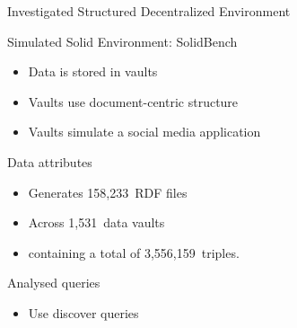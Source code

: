 \begin{frame}{Investigated Structured Decentralized Environment}
  \begin{block}{Simulated Solid Environment: SolidBench \parencite{taelman2023link}}
    \begin{itemize}
        \item Data is stored in vaults
        \item Vaults use document-centric structure
        \item Vaults simulate a social media application
    \end{itemize}
  \end{block}
  \begin{block}{Data attributes}
        \begin{itemize}
            \item Generates 158,233~RDF files 
            \item Across 1,531~data vaults
            \item containing a total of 3,556,159~triples.
    \end{itemize}
  \end{block}
  \begin{block}{Analysed queries}
        \begin{itemize}
        \item Use discover queries
    \end{itemize}
  \end{block}
\end{frame}

